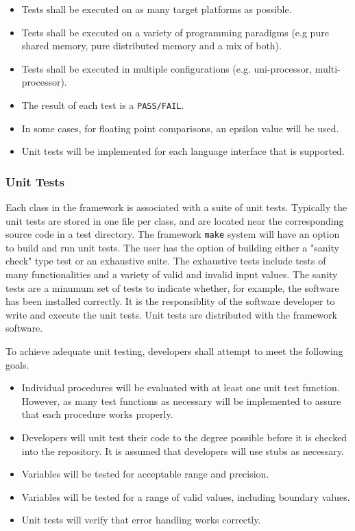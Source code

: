 \begin{itemize}
\item Tests shall be executed on as many target platforms as possible. 
\item Tests shall be executed on a variety of programming paradigms
(e.g pure shared memory, pure distributed memory and a mix of both).
\item Tests shall be executed in multiple configurations (e.g. uni-processor,
multi-processor).
\item The result of each test is a {\tt PASS/FAIL}.  
\item In some cases, for floating point comparisons, an epsilon value
will be used.
\item Unit tests will be implemented for each language interface that is 
supported.
\end{itemize}

\subsubsection{Unit Tests}

Each class in the framework is associated with a suite of unit tests.
Typically the unit tests are stored in one file per class, and are
located near the corresponding source code in a test directory.  The 
framework {\tt make} system will have an option to build and run unit tests.
The user has the option of building either a "sanity check" type test
or an exhaustive suite. The exhaustive tests include tests of many 
functionalities and a variety of valid and invalid input values. The sanity 
tests are a minumum set of tests to indicate whether, for example, the 
software has been installed correctly. It is the responsiblity of the 
software developer to write and execute the unit tests. Unit tests 
are distributed with the framework software.

To achieve adequate unit testing, developers shall attempt to meet the following goals. 

\begin{itemize}
\item Individual procedures will be evaluated with at least one unit
test function.  However, as many test functions as necessary will be
implemented to assure that each procedure works properly.  
\item Developers will unit test their code to the degree possible  
before it is checked into the repository.  It is assumed that 
developers will use stubs as necessary.
\item Variables will be tested for acceptable range and precision.
\item Variables will be tested for a range of valid values, including boundary
values.
\item Unit tests will verify that error handling works correctly.
\end{itemize}

